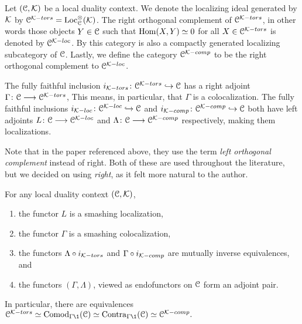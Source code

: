 \begin{construction}
    Let $(\EuScript{C}, \mathcal{K})$ be a local duality context. We denote the localizing ideal generated by $\mathcal{K}$ by $\EuScript{C}^{\mathcal{K}-tors} = \operatorname{Loc}_{\EuScript{C}}^\otimes(\mathcal{K})$. The right orthogonal complement of $\EuScript{C}^{\mathcal{K}-tors}$, in other words those objects $Y\in \EuScript{C}$ such that $\operatorname{Hom}(X, Y) \simeq 0$ for all $X\in \EuScript{C}^{\mathcal{K}-tors}$ is denoted by $\EuScript{C}^{\mathcal{K}-loc}$. By \cite[2.17]{barthel-heard-valenzuela_2018} this category is also a compactly generated localizing subcategory of $\EuScript{C}$. Lastly, we define the category $\EuScript{C}^{\mathcal{K}-comp}$ to be the right orthogonal complement to $\EuScript{C}^{\mathcal{K}-loc}$. 

    The fully faithful inclusion $i_{\mathcal{K}-tors}\colon\EuScript{C}^{\mathcal{K}-tors}\hookrightarrow \EuScript{C}$ has a right adjoint $\Gamma \colon\EuScript{C}\longrightarrow \EuScript{C}^{\mathcal{K}-tors}$, This means, in particular, that $\Gamma$ is a colocalization. The fully faithful inclusions $i_{\mathcal{K}-loc}\colon\EuScript{C}^{\mathcal{K}-loc}\hookrightarrow \EuScript{C}$ and $i_{\mathcal{K}-comp}\colon\EuScript{C}^{\mathcal{K}-comp}\hookrightarrow \EuScript{C}$ both have left adjoints $L\colon \EuScript{C}\longrightarrow \EuScript{C}^{\mathcal{K}-loc}$ and $\Lambda\colon\EuScript{C}\longrightarrow \EuScript{C}^{\mathcal{K}-comp}$ respectively, making them localizations. 
\end{construction}

\begin{remark}
    Note that in the paper \cite{barthel-heard-valenzuela_2018} referenced above, they use the term \emph{left orthogonal complement} instead of right. Both of these are used throughout the literature, but we decided on using \emph{right}, as it felt more natural to the author. 
\end{remark}

\begin{theorem}
    \label{ch3:thm:local-duality-co-contra}
    For any local duality context $(\EuScript{C}, \mathcal{K})$, 
    \begin{enumerate}
        \item the functor $L$ is a smashing localization,
        \item the functor $\Gamma$ is a smashing colocalization,
        \item the functors $\Lambda\circ i_{\mathcal{K}-tors}$ and $\Gamma \circ i_{\mathcal{K}-comp}$ are mutually inverse equivalences, and 
        \item the functors $(\Gamma, \Lambda)$, viewed as endofunctors on $\EuScript{C}$ form an adjoint pair. 
    \end{enumerate} 
    In particular, there are equivalences $\C^{\K-tors}\simeq \Comod_{\Gamma \1}(\C)\simeq \Contra_{\Gamma \1}(\C) \simeq \C^{\K-comp}.$
\end{theorem}

